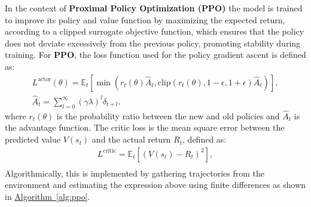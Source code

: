In the context of \textbf{Proximal Policy Optimization (PPO)}
the model is trained to improve its policy and value function by maximizing the expected return,
according to a clipped surrogate objective function, which ensures that the policy does not deviate excessively from the previous policy,
promoting stability during training.
For \textbf{PPO}, the loss function used for the policy gradient ascent is defined as:
\begin{gather*}
    L^{\text{actor}}(\theta) = \mathbb{E}_t \left[ \min \left( r_t(\theta) \hat{A}_t, \text{clip}(r_t(\theta), 1 - \epsilon, 1 + \epsilon) \hat{A}_t \right) \right],\\
    \hat{A}_t = \sum_{l=0}^{\infty} (\gamma \lambda)^l \delta_{t+l}.
\end{gather*}
where \( r_t(\theta) \) is the probability ratio between the new and old policies and $\hat{A}_t$ is the advantage function.
The critic loss is the mean square error between the predicted value $V(s_t)$ and the actual return $R_t$, defined as:
\begin{gather*}
    L^{\text{critic}} = \mathbb{E}_t \left[ \left( V(s_t) - R_t \right)^2 \right],\\
\end{gather*}
Algorithmically, this is implemented by gathering trajectories from the environment and estimating the expression above using finite differences
as shown in \hyperref[alg:ppo]{Algorithm~\ref{alg:ppo}}.
